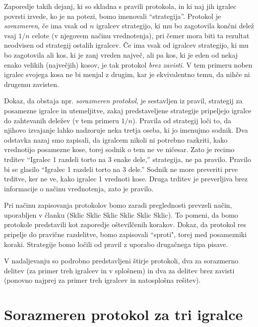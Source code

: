 \documentclass[a4paper,12pt]{article}
\begin{document}
Zaporedje takih dejanj, ki so skladna s pravili protokola, in ki naj jih igralec povrsti izvede, ko je na potezi, bomo imenovali ``strategija''. Protokol je {\em sorazmeren}, če ima vsak od $n$ igralcev strategijo, ki mu bo zagotovila končni delež vsaj $1/n$ celote (v njegovem načinu vrednotenja), pri čemer mora biti ta rezultat neodvisen od strategij ostalih igralcev. Če ima vsak od igralcev strategijo, ki mu bo zagotovila ali kos, ki je zanj vreden največ, ali pa kos, ki je eden od nekaj enako velikih (največjih) kosov, je tak protokol {\em brez zavisti}. V tem primeru noben igralec svojega kosa ne bi menjal z drugim, kar je ekvivalentno temu, da nihče ni drugemu zavisten.

Dokaz, da obstaja npr. {\em sorazmeren protokol}, je sestavljen iz pravil, strategij za posamezne igralce in utemeljitve, zakaj predstaveljene strategije pripeljejo igralce do zahtevanih deležev (v tem primeru $1/n$). Pravila od strategij loči to, da njihovo izvajanje lahko nadzoruje neka tretja oseba, ki jo imenujmo sodnik. Dva odstavka nazaj smo zapisali, da igralcem nikoli ni potrebno razkriti, kako vrednotijo posamezne kose, torej sodnik o tem ne ve ničesar. Zato je recimo trditev ``Igralec 1 razdeli torto na 3 enake dele,'' strategija, ne pa pravilo. Pravilo bi se glasilo ``Igralec 1 razdeli torto na 3 dele.'' Sodnik ne more preveriti prve trditve, ker ne ve, kako igralec 1 vrednoti kose. Druga trditev je preverljiva brez informacije o načinu vrednotenja, zato je pravilo.

Pri načinu zapisovanja protokolov bomo zaradi preglednosti prevzeli način, uporabljen v članku (Sklic Sklic Sklic Sklic Sklic Sklic). To pomeni, da bomo protokole predstavili kot zaporedje oštevilčenih korakov. Dokaz, da protokol res pripelje do pravične razdelitve, bomo zapisovali ``sproti", torej med posamezniki koraki. Strategije bomo ločili od pravil z uporabo drugačnega tipa pisave. %

V nadaljevanju so podrobno predstavljeni štirje protokoli, dva za sorazmerno delitev (za primer treh igralcev in v splošnem) in dva za delitev brez zavisti (ponovno najprej za primer treh igralcev in natosplošna rešitev).


\section{Sorazmeren protokol za tri igralce}
\end{document}

